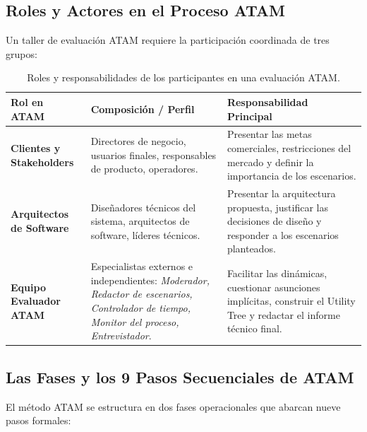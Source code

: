 \subsection{Roles y Actores en el Proceso ATAM}

Un taller de evaluación ATAM requiere la participación coordinada de tres grupos:

\begin{table}[htbp]
\centering
\small
\begin{tabularx}{\textwidth}{l p{4.5cm} X}
\toprule
\textbf{Rol en ATAM} & \textbf{Composición / Perfil} & \textbf{Responsabilidad Principal} \\
\midrule
\textbf{Clientes y Stakeholders} & Directores de negocio, usuarios finales, responsables de producto, operadores. & Presentar las metas comerciales, restricciones del mercado y definir la importancia de los escenarios. \\
\addlinespace
\textbf{Arquitectos de Software} & Diseñadores técnicos del sistema, arquitectos de software, líderes técnicos. & Presentar la arquitectura propuesta, justificar las decisiones de diseño y responder a los escenarios planteados. \\
\addlinespace
\textbf{Equipo Evaluador ATAM} & Especialistas externos e independientes: \emph{Moderador, Redactor de escenarios, Controlador de tiempo, Monitor del proceso, Entrevistador}. & Facilitar las dinámicas, cuestionar asunciones implícitas, construir el Utility Tree y redactar el informe técnico final. \\
\bottomrule
\end{tabularx}
\caption{Roles y responsabilidades de los participantes en una evaluación ATAM.}
\label{tab:roles-atam}
\end{table}

\subsection{Las Fases y los 9 Pasos Secuenciales de ATAM}

El método ATAM se estructura en dos fases operacionales que abarcan nueve pasos formales:

